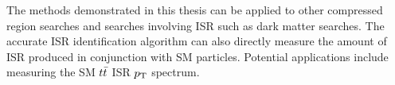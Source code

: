 


\indent The methods demonstrated in this thesis can be applied to other compressed region searches and searches involving ISR such as dark matter searches.  The accurate ISR identification algorithm can also directly measure the amount of ISR produced in conjunction with SM particles. Potential applications include measuring the SM $t\bar{t}$ ISR $p_{\mathrm{T}}$ spectrum. \\

